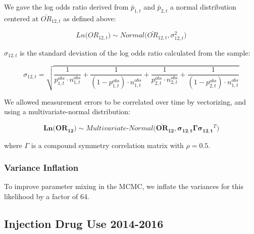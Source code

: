 \documentclass{article}
\begin{document}
We gave the log odds ratio derived from $\bar{p}_{1,t}$ and $\bar{p}_{2,t}$ a normal distribution centered at $\bar{OR}_{12,t}$ as defined above:

\begin{equation}
	Ln\big(OR_{12,t}\big) \sim Normal\big(\bar{OR}_{12,t}, \sigma_{12,t}^2 \big)
\end{equation}

$\sigma_{12,t}$ is the standard deviation of the log odds ratio calculated from the sample:

\begin{equation}
	\sigma_{12,t} = \sqrt{\frac{1}{p^{obs}_{1,t} \cdot n^{obs}_{1,t}} + \frac{1}{(1-p^{obs}_{1,t}) \cdot n^{obs}_{1,t}} + \frac{1}{p^{obs}_{2,t} \cdot n^{obs}_{2,t}} + \frac{1}{(1-p^{obs}_{2,t}) \cdot n^{obs}_{1,t}}}
\end{equation}

We allowed measurement errors to be correlated over time by vectorizing, and using a multivariate-normal distribution:

\begin{equation}
	\bm{Ln\big(OR_{12}\big)} \sim Multivariate\text{-}Normal\big(\bm{\bar{OR}_{12}}, \bm{\sigma_{12,t}} \bm{\Gamma} \bm{\sigma_{12,t}}^T \big)
\end{equation}

where $\Gamma$ is a compound symmetry correlation matrix with $\rho=0.5$.

\subsubsection{Variance Inflation}
To improve parameter mixing in the MCMC, we inflate the variances for this likelihood by a factor of 64.


\subsection{Injection Drug Use 2014-2016}
\end{document}
